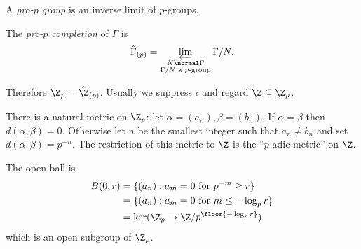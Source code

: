 \documentclass[a4paper]{article}
\begin{document}
\begin{definition}
  A \emph{pro-\(p\) group} is an inverse limit of \(p\)-groups.

  The \emph{pro-\(p\) completion} of \(\Gamma\) is
  \[
    \hat \Gamma_{(p)} = \varprojlim_{\substack{N \normal \Gamma \\ \Gamma/N \text{ a \(p\)-group}}} \Gamma/N.
  \]
\end{definition}

Therefore \(\Z_p = \hat \Z_{(p)}\). Usually we suppress \(\iota\) and regard \(\Z \subseteq \Z_p\).

There is a natural metric on \(\Z_p\): let \(\alpha = (a_n), \beta = (b_n)\). If \(\alpha = \beta\) then \(d(\alpha, \beta) = 0\). Otherwise let \(n\) be the smallest integer such that \(a_n \ne b_n\) and set \(d(\alpha, \beta) = p^{-n}\). The restriction of this metric to \(\Z\) is the ``\(p\)-adic metric'' on \(\Z\).

The open ball is
\begin{align*}
  B(0, r)
  &= \{(a_n): a_m = 0 \text{ for } p^{-m} \geq r\} \\
  &= \{(a_n): a_m = 0 \text{ for } m \leq -\log_p r\} \\
  &= \ker(\Z_p \to \Z/p^{\floor{-\log_p r}})
\end{align*}
which is an open subgroup of \(\Z_p\).





\printindex
\end{document}
